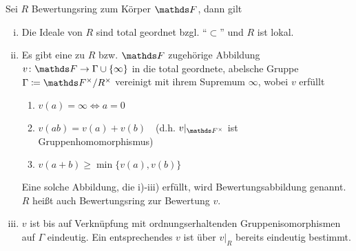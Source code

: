 \documentclass[ngerman,fontsize=11pt, paper=a4, parskip=half, titlepage=true, toc=bib]{scrartcl}
\begin{document}
\begin{Lem}\label{eigbewertungsring}
  Sei $R$ Bewertungsring zum Körper $\F$, dann gilt
  \begin{enumerate}[i)]
  \item Die Ideale von $R$ sind total geordnet bzgl. 
    \enquote{$\subset$} und $R$ ist lokal.
  \item Es gibt eine zu $R$ bzw. $\F$ zugehörige Abbildung
    $v\colon\F\to\Gamma\cup\{\infty\}$ in die total geordnete, abelsche Gruppe
    $\Gamma\coloneqq \Fx/R^\times$ vereinigt mit ihrem Supremum $\infty$, wobei $v$ erfüllt
    \begin{enumerate}[(1)]
    \item $v(a)=\infty \Longleftrightarrow a=0$
    \item $v(ab)=v(a)+v(b)$~~(d.h. $v|_{\Fx}$ ist Gruppenhomomorphismus)
    \item $v(a+b)\geq \min\{v(a),v(b)\}$
    \end{enumerate}
    Eine solche Abbildung, die i)-iii) erfüllt,
    wird Bewertungsabbildung genannt.
    $R$ heißt auch Bewertungsring zur Bewertung $v$.
  \item $v$ ist bis auf Verknüpfung mit ordnungserhaltenden 
    Gruppenisomorphismen auf $\Gamma$ eindeutig.
    Ein entsprechendes $v$ ist über $v|_{R}$ bereits eindeutig 
    bestimmt.
  \end{enumerate}


\end{Lem}
\end{document}
